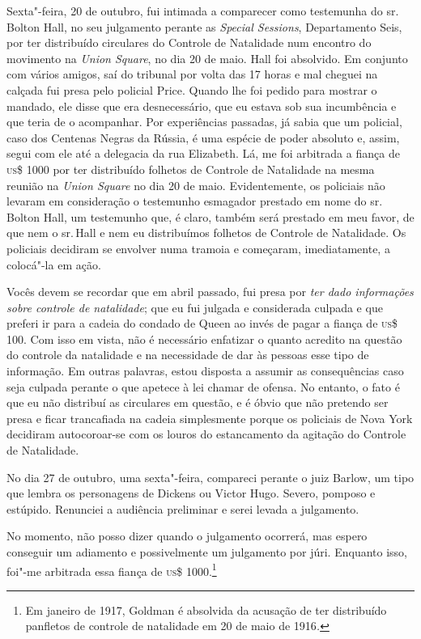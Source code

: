 Sexta"-feira, 20 de outubro, fui intimada a comparecer como testemunha do
sr.\,Bolton Hall, no seu julgamento perante as \emph{Special Sessions},
Departamento Seis, por ter distribuído circulares do Controle de
Natalidade num encontro do movimento na \emph{Union Square}, no dia 20
de maio. Hall foi absolvido. Em conjunto com vários amigos, saí do
tribunal por volta das 17 horas e mal cheguei na calçada fui presa pelo
policial Price. Quando lhe foi pedido para mostrar o mandado, ele disse
que era desnecessário, que eu estava sob sua incumbência e que teria de
o acompanhar. Por experiências passadas, já sabia que um policial, caso
dos Centenas Negras da Rússia, é uma espécie de poder absoluto e, assim,
segui com ele até a delegacia da rua Elizabeth. Lá, me foi arbitrada a
fiança de \textsc{us}\$ 1000 por ter distribuído folhetos de Controle de
Natalidade na mesma reunião na \emph{Union Square} no dia 20 de maio.
Evidentemente, os policiais não levaram em consideração o testemunho
esmagador prestado em nome do sr.\,Bolton Hall, um testemunho que, é
claro, também será prestado em meu favor, de que nem o sr.\,Hall e nem eu
distribuímos folhetos de Controle de Natalidade. Os policiais decidiram
se envolver numa tramoia e começaram, imediatamente, a colocá"-la em
ação.

Vocês devem se recordar que em abril passado, fui presa por \emph{ter
dado informações sobre controle de natalidade}; que eu fui julgada e
considerada culpada e que preferi ir para a cadeia do condado de Queen
ao invés de pagar a fiança de \textsc{us}\$ 100. Com isso em vista, não é
necessário enfatizar o quanto acredito na questão do controle da
natalidade e na necessidade de dar às pessoas esse tipo de informação.
Em outras palavras, estou disposta a assumir as consequências caso seja
culpada perante o que apetece à lei chamar de ofensa. No entanto, o fato
é que eu não distribuí as circulares em questão, e é óbvio que não
pretendo ser presa e ficar trancafiada na cadeia simplesmente porque os
policiais de Nova York decidiram autocoroar-se com os louros do estancamento
da agitação do Controle de Natalidade.


No dia 27 de outubro, uma sexta"-feira, compareci perante o juiz Barlow,
um tipo que lembra os personagens de Dickens ou Victor Hugo. Severo,
pomposo e estúpido. Renunciei a audiência preliminar e serei levada a
julgamento.

No momento, não posso dizer quando o julgamento ocorrerá, mas espero
conseguir um adiamento e possivelmente um julgamento por júri. Enquanto
isso, foi"-me arbitrada essa fiança de \textsc{us}\$ 1000.\footnote{Em janeiro de
  1917, Goldman é absolvida da acusação de ter distribuído panfletos de
  controle de natalidade em 20 de maio de 1916\emph{.}}

